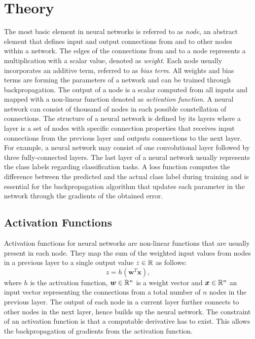 
\section{Theory}\label{sec:nn_theory}
The most basic element in neural networks is referred to as \emph{node}, an abstract element that defines input and output connections from and to other nodes within a network.
The edges of the connections from and to a node represents a multiplication with a scalar value, denoted as \emph{weight}.
Each node usually incorporates an additive term, referred to as \emph{bias term}.
All weights and bias terms are forming the parameters of a network and can be trained through backpropagation.
The output of a node is a scalar computed from all inputs and mapped with a non-linear function denoted as \emph{activation function}.
A neural network can consist of thousand of nodes in each possible constellation of connections.
The structure of a neural network is defined by its layers where a layer is a set of nodes with specific connection properties that receives input connections from the previous layer and outputs connections to the next layer.
For example, a neural network may consist of one convolutional layer followed by three fully-connected layers.
The last layer of a neural network usually represents the class labels regarding classification tasks.
A loss function computes the difference between the predicted and the actual class label during training and is essential for the backpropagation algorithm that updates each parameter in the network through the gradients of the obtained error.



\subsection{Activation Functions}\label{sec:nn_theory_acti}
Activation functions for neural networks are non-linear functions that are usually present in each node.
They map the sum of the weighted input values from nodes in a previous layer to a single output value $z \in \mathbb{R}$ as follows:
\begin{equation}\label{eq:nn_theory_acti}
  z = h(\bm{w}^T \bm{x}),
\end{equation}
where $h$ is the activation function, $\bm{w} \in \mathbb{R}^n$ is a weight vector and $\bm{x} \in \mathbb{R}^n$ an input vector representing the connections from a total number of $n$ nodes in the previous layer.
The output of each node in a current layer further connects to other nodes in the next layer, hence builds up the neural network.
The constraint of an activation function is that a computable derivative has to exist.
This allows the backpropagation of gradients from the activation function.

